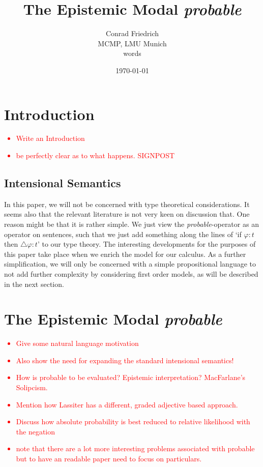 \documentclass{article}
\title{The Epistemic Modal \emph{probable}}
\author{Conrad Friedrich \\ MCMP, LMU Munich \\ \wordcount words}
\date{\today}
\theoremstyle{definition}
\newcommand\todo[1]{\textcolor{red}{#1}}
\begin{document}
\onehalfspacing

\maketitle

\tableofcontents
\section{Introduction}

\todo{
  \begin{itemize}[nosep]
    \item Write an Introduction
     \item be perfectly clear as to what happens. SIGNPOST 
  \end{itemize}
}

\subsection{Intensional Semantics}
In this paper, we will not be concerned with type theoretical considerations. It seems also that the relevant literature is not very keen on discussion that. One reason might be that it is rather simple. We just view the \emph{probable}-operator as an operator on sentences, such that we just add something along the lines of `if $\varphi:t$ then $\triangle \varphi:t$' to our type theory. The interesting developments for the purposes of this paper take place when we enrich the model for our calculus. As a further simplification, we will only be concerned with a simple propositional language to not add further complexity by considering first order models, as will be described in the next section.

\section{The Epistemic Modal \emph{probable}}
\todo{\begin{itemize}[nosep]
    \item  Give some natural language motivation
    \item Also show the need for expanding the standard intensional semantics!
    \item How is probable to be evaluated? Epistemic interpretation? MacFarlane's Solipcism.
    \item Mention how Lassiter has a different, graded adjective based approach.
    \item Discuss how absolute probability is best reduced to relative likelihood with the negation
      \item note that there are a lot more interesting problems associated with probable but to have an readable paper need to focus on particulars.
  \end{itemize}
}
\end{document}
